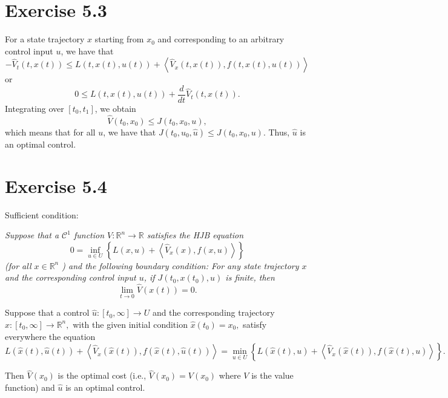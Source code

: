 \documentclass[11pt]{report}
\begin{document}
\section*{Exercise 5.3}
For a state trajectory $x$ starting from $x_0$ and corresponding to an arbitrary control input $u$, we have that 
\[
-\hat{V}_{t}(t, x(t)) \leq L(t, x(t), u(t))+\left\langle\hat{V}_{x}(t, x(t)), f(t, x(t), u(t))\right\rangle
\]
or
\[
0 \leq L(t, x(t), u(t))+\frac{d}{dt}\hat{V}_{t}(t, x(t)).
\]
Integrating over $[t_0, t_1]$, we obtain
\[
\hat{V}(t_0, x_0) \leq J(t_0, x_0, u),
\]
which means that for all $u$, we have that $J(t_0, u_0, \hat{u}) \leq J(t_0, x_0, u)$. Thus, $\hat{u}$ is an optimal control.

\section*{Exercise 5.4}
Sufficient condition: {\em
Suppose that a $\mathcal{C}^{1}$ function $V: \mathbb{R}^{n} \rightarrow \mathbb{R}$ satisfies the HJB equation
$$
0 = \inf_{u \in U}\left\{L(x, u)+\left\langle\hat{V}_{x}(x), f(x, u)\right\rangle\right\}
$$
(for all $x \in \mathbb{R}^{n}$ ) and the following boundary condition: For any state trajectory $x$ and the corresponding control input $u$, if $J(t_0, x(t_0), u)$ is finite, then
$$
\lim_{t \to 0}\widehat{V}\left(x(t)\right) = 0.
$$

Suppose that a control $\hat{u}:\left[t_{0}, \infty\right] \rightarrow U$ and the corresponding trajectory $\hat{x}:\left[t_{0}, \infty\right] \rightarrow \mathbb{R}^{n},$ with the given initial condition $\hat{x}\left(t_{0}\right)=x_{0},$ satisfy everywhere the equation
$$
L(\hat{x}(t), \hat{u}(t))+\left\langle\hat{V}_{x}(\hat{x}(t)), f(\hat{x}(t), \hat{u}(t))\right\rangle=\min _{u \in U}\left\{L(\hat{x}(t), u)+\left\langle\widehat{V}_{x}(\hat{x}(t)), f(\hat{x}(t), u)\right\rangle\right\}.
$$

Then $\widehat{V}(x_0)$ is the optimal cost (i.e., $\widehat{V}(x_0) = V(x_0)$ where $V$ is the value function) and $\hat{u}$ is an optimal control.
}
\end{document}
